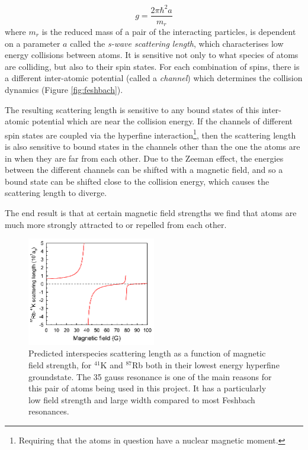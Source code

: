 \begin{equation}
g = \frac{2\pi \hbar^2 a}{m_r}
\end{equation}
where $m_r$ is the reduced mass of a pair of the interacting particles, is dependent on a parameter $a$ called the \emph{s-wave scattering length}, which characterises low energy collisions between atoms. It is sensitive not only to what species of atoms are colliding, but also to their spin states. For each combination of spins, there is a different inter-atomic potential (called a \emph{channel}) which determines the collision dynamics (Figure \ref{fig:feshbach}).

The resulting scattering length is sensitive to any bound states of this inter-atomic potential which are near the collision energy. If the channels of different spin states are coupled via the hyperfine interaction\footnote{Requiring that the atoms in question have a nuclear magnetic moment.}, then the scattering length is also sensitive to bound states in the channels other than the one the atoms are in when they are far from each other. Due to the Zeeman effect, the energies between the different channels can be shifted with a magnetic field, and so a bound state can be shifted close to the collision energy, which causes the scattering length to diverge.

The end result is that at certain magnetic field strengths we find that atoms are much more strongly attracted to or repelled from each other.

\begin{figure}%
\begin{center}
\includegraphics[width=0.5\textwidth]{figures/unsorted/feshKRb.png}
\caption{Predicted interspecies scattering length \cite{thalhammer_double_2008} as a function of magnetic field strength, for $^{41}$K and $^{87}$Rb both in their lowest energy hyperfine groundstate. The 35 gauss resonance is one of the main reasons for this pair of atoms being used in this project. It has a particularly low field strength and large width compared to most Feshbach resonances.}\label{fig:feshKRb}
\end{center}
\end{figure}

